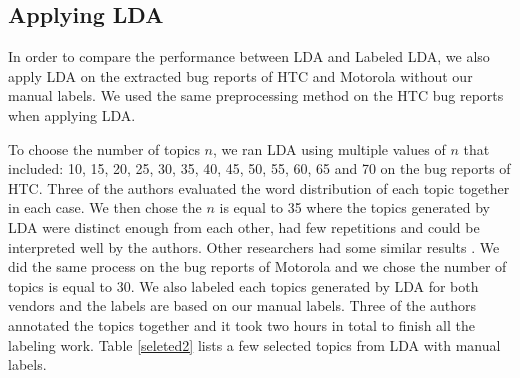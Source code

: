 \documentclass[10pt, conference, compsocconf]{IEEEtran}
\begin{document}


\subsection{Applying LDA}





In order to compare the performance between LDA and Labeled LDA, we
also apply LDA on the extracted bug reports of HTC and Motorola
without our manual labels. 
We used the same preprocessing method on the HTC bug reports when applying LDA. 

To choose the number of topics $n$, we ran LDA using multiple values
of $n$ that included: 10, 15, 20, 25, 30, 35, 40, 45, 50, 55, 60, 65
and 70 on the bug reports of HTC. 
Three of the authors evaluated the word distribution of each topic
together in each case. 
We then chose the $n$ is equal to 35 where the topics generated by LDA
were distinct enough from each other, had few repetitions and could be
interpreted well by the authors. 
Other researchers had some similar results \cite{Thomas:2011}
\cite{Hindle}. 
We did the same process on the bug reports of Motorola and we chose
the number of topics is equal to 30. 
We also labeled each topics generated by LDA for both vendors and the
labels are based on our manual labels. 
Three of the authors annotated the topics together and it took two
hours in total to finish all the labeling work. 
Table \ref{seleted2} lists a few selected topics from LDA with manual labels.
\end{document}
